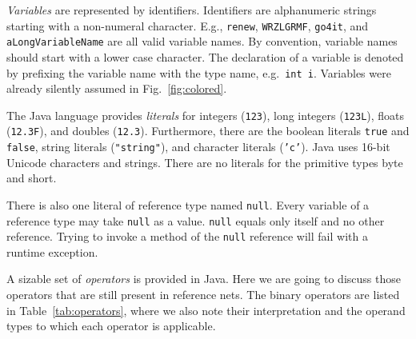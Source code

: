 \emph{Variables} are represented by identifiers. Identifiers are
alphanumeric strings starting with
a non-numeral character. E.g., \texttt{renew}, \texttt{WRZLGRMF},
\texttt{go4it}, and \texttt{aLongVariableName} are all
valid variable names. By convention, variable names should start
with a lower case character. The declaration of a variable
is denoted by prefixing the variable name with the type name,
e.g.\ \texttt{int i}. Variables were already silently assumed in
Fig.~\ref{fig:colored}.

The Java language provides \emph{literals} for integers (\texttt{123}),
long integers (\texttt{123L}), floats (\texttt{12.3F}),
and doubles (\texttt{12.3}). Furthermore, there are the boolean
literals \texttt{true} and \texttt{false}, string literals
(\texttt{"string"}), and character literals (\texttt{'c'}).
Java uses 16-bit Unicode characters and strings. There
are no literals for the primitive types byte and short.

There is also one literal of reference type named \texttt{null}.
Every variable of a reference type may take \texttt{null} as a value.
\texttt{null} equals only itself and no other reference.
Trying to invoke a method of the \texttt{null} reference will
fail with a runtime exception.

A sizable set of \emph{operators} is provided in Java.
Here we are going to discuss those operators that are still
present in reference nets.
The binary operators are listed in Table~\ref{tab:operators},
where we also note their interpretation and the operand types
to which each operator is applicable.

